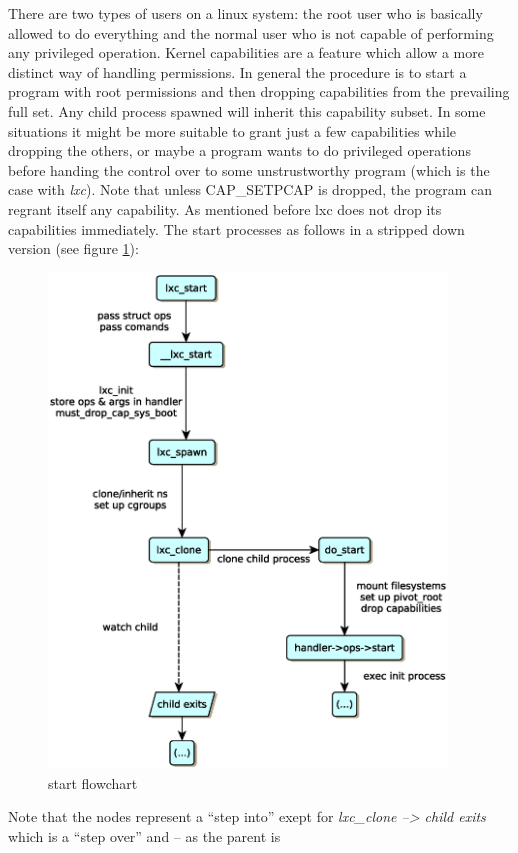 There are two types of users on a linux system: the root user who is basically allowed to do everything and the normal user 
who is not capable of performing any privileged operation. Kernel capabilities are a feature which allow a more distinct way of handling
permissions. In general the procedure is to start a program with root permissions and then dropping capabilities from the prevailing full set.
Any child process spawned will inherit this capability subset.
In some situations it might be more suitable to grant just a few capabilities while dropping the others, or maybe a program wants to do
privileged operations before handing the control over to some unstrustworthy program (which is the case with \textit{lxc}). Note
that unless CAP\_SETPCAP is dropped, the program can regrant itself any capability\cite{kernelcaps}.
As mentioned before lxc does not drop its capabilities immediately. The start processes as follows in a stripped down version (see figure \ref{figure_1}):\\
\begin{figure}[htb]
\begin{center}
  \includegraphics[width=300pt]{fig/figure_1.eps}
  \caption{start flowchart}
  \label{figure_1}
\end{center}
\end{figure}
Note that the nodes represent a ``step into'' exept for \textit{lxc\_clone --> child exits} which is a ``step over'' and -- as the parent is

